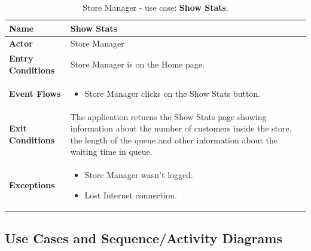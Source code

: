 \begin{table}[H]
    \centering
    \begin{tabular}{| m{} | m{} |}
        \hline
        \textbf{Name}            & Show Stats                                                                                                                                                                                     \\
        \hline
        \textbf{Actor}            & Store Manager                                                                                                                                                                                  \\
        \hline
        \textbf{Entry Conditions} & Store Manager is on the Home page.                                                                                                                                                             \\
        \hline
        \textbf{Event Flows} &
        \begin{itemize}
            \item Store Manager clicks on the Show Stats button.
        \end{itemize} \\
        \hline
        \textbf{Exit Conditions}  & The application returns the Show Stats page showing information about the number of customers inside the store, the length of the queue and other information about the waiting time in queue. \\
        \hline
        \textbf{Exceptions} &
        \begin{itemize}
            \item Store Manager wasn't logged.
            \item Lost Internet connection.
        \end{itemize} \\
        \hline
    \end{tabular}
    \caption{Store Manager - use case: \textbf{Show Stats}.}
    \label{tableGetStatus}
\end{table}

\subsection{Use Cases and Sequence/Activity Diagrams}

